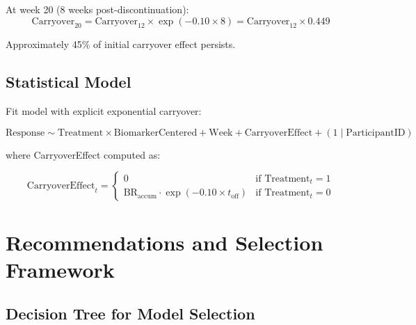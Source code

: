 \documentclass[11pt,a4paper]{article}
\begin{document}
At week 20 (8 weeks post-discontinuation):
\begin{equation}
  \text{Carryover}_{20} = \text{Carryover}_{12} \times \exp(-0.10 \times 8) = \text{Carryover}_{12} \times 0.449
\end{equation}

Approximately 45\% of initial carryover effect persists.

\subsection{Statistical Model}

Fit model with explicit exponential carryover:

\begin{equation}
  \text{Response} \sim \text{Treatment} \times \text{BiomarkerCentered} + \text{Week} + \text{CarryoverEffect} + (1 \mid \text{ParticipantID})
\end{equation}

where CarryoverEffect computed as:

\begin{equation}
  \text{CarryoverEffect}_t = \begin{cases}
    0 & \text{if Treatment}_t = 1 \\
    \text{BR}_{\text{accum}} \cdot \exp(-0.10 \times t_{\text{off}}) & \text{if Treatment}_t = 0
  \end{cases}
\end{equation}

\section{Recommendations and Selection Framework}
\label{sec:recommendations}

\subsection{Decision Tree for Model Selection}
\end{document}
